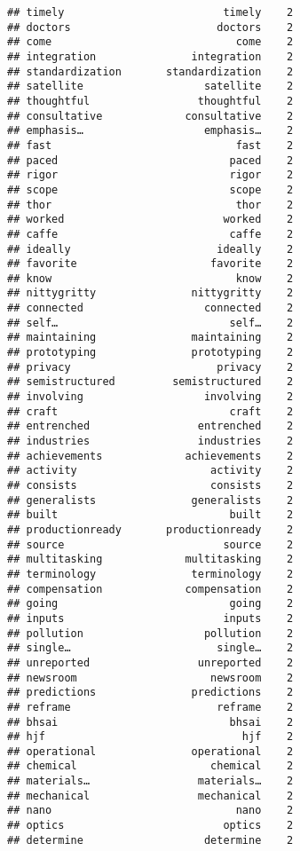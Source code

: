 \documentclass[]{article}
\begin{document}
\begin{verbatim}
## timely                         timely    2
## doctors                       doctors    2
## come                             come    2
## integration               integration    2
## standardization       standardization    2
## satellite                   satellite    2
## thoughtful                 thoughtful    2
## consultative             consultative    2
## emphasis…                   emphasis…    2
## fast                             fast    2
## paced                           paced    2
## rigor                           rigor    2
## scope                           scope    2
## thor                             thor    2
## worked                         worked    2
## caffe                           caffe    2
## ideally                       ideally    2
## favorite                     favorite    2
## know                             know    2
## nittygritty               nittygritty    2
## connected                   connected    2
## self…                           self…    2
## maintaining               maintaining    2
## prototyping               prototyping    2
## privacy                       privacy    2
## semistructured         semistructured    2
## involving                   involving    2
## craft                           craft    2
## entrenched                 entrenched    2
## industries                 industries    2
## achievements             achievements    2
## activity                     activity    2
## consists                     consists    2
## generalists               generalists    2
## built                           built    2
## productionready       productionready    2
## source                         source    2
## multitasking             multitasking    2
## terminology               terminology    2
## compensation             compensation    2
## going                           going    2
## inputs                         inputs    2
## pollution                   pollution    2
## single…                       single…    2
## unreported                 unreported    2
## newsroom                     newsroom    2
## predictions               predictions    2
## reframe                       reframe    2
## bhsai                           bhsai    2
## hjf                               hjf    2
## operational               operational    2
## chemical                     chemical    2
## materials…                 materials…    2
## mechanical                 mechanical    2
## nano                             nano    2
## optics                         optics    2
## determine                   determine    2

\end{verbatim}
\end{document}
